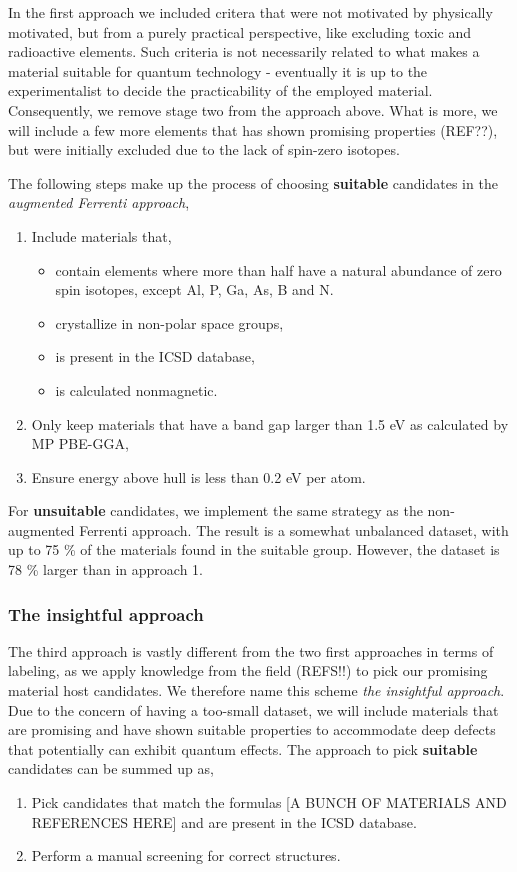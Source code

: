 \documentclass[superscriptaddress,unsortedaddress,
 amsmath,amssymb,
 aps,
]{revtex4-2}
\begin{document}
In the first approach we included critera that were not motivated by physically 
motivated, but from a purely practical perspective, like excluding toxic and
radioactive elements. Such criteria is not necessarily related to what makes 
a material suitable for quantum technology - eventually it is up to the 
experimentalist to decide the practicability of the employed material.
Consequently, we remove stage two from the approach above. What is more, we will
include a few more elements that has shown promising properties (REF??), but were
initially excluded due to the lack of spin-zero isotopes. 

The following steps make up the process of choosing \textbf{suitable} candidates 
in the \emph{augmented Ferrenti approach},
\begin{enumerate}
    \item Include materials that,
    \begin{itemize}
        \item contain elements where more than half have a natural abundance of zero spin
            isotopes, except Al, P, Ga, As, B and N.
        \item crystallize in non-polar space groups,
        \item is present in the ICSD database,
        \item is calculated nonmagnetic.
    \end{itemize}
    \item Only keep materials that have a band gap larger than 1.5 eV as
        calculated by MP PBE-GGA,
    \item Ensure energy above hull is less than 0.2 eV per atom. 
\end{enumerate}

For \textbf{unsuitable} candidates, we implement the same strategy as the non-augmented
Ferrenti approach. The result is a somewhat unbalanced dataset, with up to 75 \% of the 
materials found in the suitable group. However, the dataset is 78 \% larger than in
approach 1.

\subsubsection*{The insightful approach}
The third approach is vastly different from the two first approaches in terms
of labeling, as we apply knowledge from the field (REFS!!) 
to pick our promising material host candidates. We therefore name this scheme 
\emph{the insightful approach}.
Due to the concern of having a too-small dataset, we will include
materials that are promising and have shown suitable properties to
accommodate deep defects that potentially can exhibit quantum effects.
The approach to pick \textbf{suitable} candidates can be summed up as,
\begin{enumerate}
    \item Pick candidates that match the formulas [A BUNCH OF MATERIALS AND REFERENCES HERE] and are present in the ICSD database.  
    \item Perform a manual screening for correct structures.
\end{enumerate}
\end{document}
